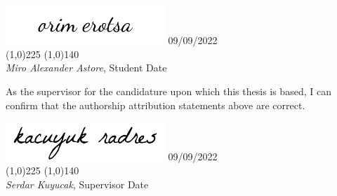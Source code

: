 
\includegraphics[width=6cm]{figures/signatures/orim_sig_fake.png} \hspace{3.0cm} 09/09/2022\\
\noindent \line(1,0){225} \hspace{1.0cm} \line(1,0){140} \\
 {\em Miro Alexander Astore}, Student \hspace{3.65cm} Date
 
 \vspace{1in}

\noindent As the supervisor for the candidature upon which this thesis is based, 
I can confirm that the authorship attribution statements above are correct.

\vspace{1in}


\includegraphics[width=6cm]{figures/signatures/serdar_fake_sig.png} \hspace{3.0cm} 09/09/2022\\
\noindent \line(1,0){225} \hspace{1.0cm} \line(1,0){140} \\
{\em Serdar Kuyucak}, Supervisor \hspace{5.7cm} Date
